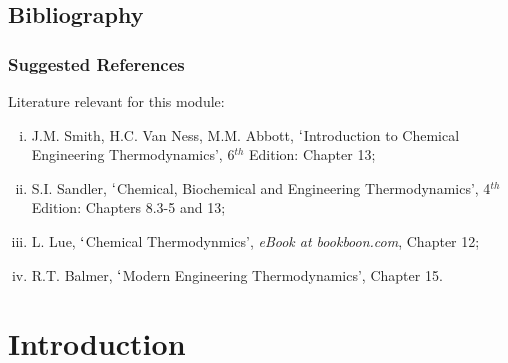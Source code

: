 \documentclass[10pt,compress]{beamer}
\begin{document}
\subsection{Bibliography}
\begin{frame}
 \frametitle{Suggested References}
  Literature relevant for this module:
  \begin{enumerate}[(i)]
   \item\label{SVN_Book} J.M. Smith, H.C. Van Ness, M.M. Abbott, $\lq$Introduction to Chemical Engineering Thermodynamics', 6$^{th}$ Edition: Chapter 13;
   \item\label{Sandle_Book} S.I. Sandler, $\lq$Chemical, Biochemical and Engineering Thermodynamics', 4$^{th}$ Edition: Chapters 8.3-5 and 13;
   \item\label{Lue_Book} L. Lue, $\lq$Chemical Thermodynmics', {\it eBook at bookboon.com}, Chapter 12;
   \item\label{Balmer_Book}R.T. Balmer, $\lq$Modern Engineering Thermodynamics', Chapter 15.
  \end{enumerate}
\end{frame}


\section{Introduction}
\end{document}
